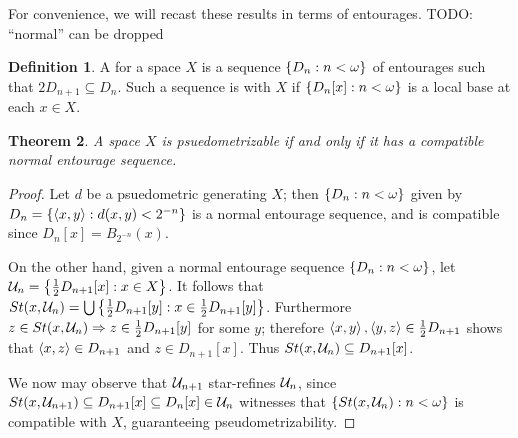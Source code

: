\documentclass{amsart}
\newtheorem{theorem}{Theorem}[section]
\theoremstyle{definition}
\newtheorem{definition}[theorem]{Definition}
\begin{document}
For convenience, we will recast these results in terms of entourages.
TODO: ``normal'' can be dropped

\begin{definition}
A  for a space \(X\) is a sequence
\(\left\{D_n:n<\omega\right\}\) of entourages such that
\(2D_{n+1}\subseteq D_n\). Such a sequence is
 with \(X\) if \(\left\{D_n[x]:n<\omega\right\}\)
is a local base at each \(x\in X\).
\end{definition}
\begin{theorem}
A space \(X\) is psuedometrizable if and only if it has a compatible
normal entourage sequence.
\end{theorem}
\begin{proof}
Let \(d\) be a psuedometric generating \(X\); then \(\left\{D_n:n<\omega\right\}\)
given by \(D_n=\left\{\left\langle x,y\right\rangle:d(x,y)<2^{-n}\right\}\) is a normal entourage sequence,
and is compatible since \(D_n[x]=B_{2^{-n}}(x)\). 

On the other hand, given a normal entourage sequence \(\left\{D_n:n<\omega\right\}\),
let \(\mathcal{U}_n=\left\{\frac{1}{2}D_{n+1}[x]:x\in X\right\}\).  It follows that
\(St(x,\mathcal{U}_n)=\bigcup\left\{\frac{1}{2}D_{n+1}[y]:x\in\frac{1}{2}D_{n+1}[y]\right\}\).
Furthermore \(z\in St(x,\mathcal{U}_n)\Rightarrow z\in\frac{1}{2}D_{n+1}[y]\) for
some \(y\); therefore \(\left\langle x,y\right\rangle,\left\langle y,z\right\rangle\in \frac{1}{2}D_{n+1}\) shows that 
\(\left\langle x,z\right\rangle\in D_{n+1}\) and \(z\in D_{n+1}[x]\). 
Thus \(St(x,\mathcal{U}_n)\subseteq D_{n+1}[x]\).

We now may observe that \(\mathcal{U}_{n+1}\) star-refines \(\mathcal{U}_n\), since
\(St(x,\mathcal{U}_{n+1})\subseteq D_{n+1}[x]\subseteq D_n[x]\in\mathcal{U}_n\)
witnesses that \(\left\{St(x,\mathcal{U}_n):n<\omega\right\}\) is compatible with \(X\),
guaranteeing pseudometrizability.
\end{proof}
\end{document}

